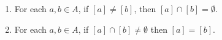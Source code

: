 \begin{enumerate}
\begin{enumerate}
  \item For each  $a, b \in A$,   if  $\left[ a \right] \ne \left[ b \right]$, then   
        $\left[ a \right] \cap \left[ b \right] = \emptyset $.

  \item For each  $a, b \in A$, if  $\left[ a \right] \cap \left[ b \right] \ne \emptyset $                         then  $\left[ a \right] = \left[ b \right]$.
\end{enumerate}


%
%
\end{enumerate}

